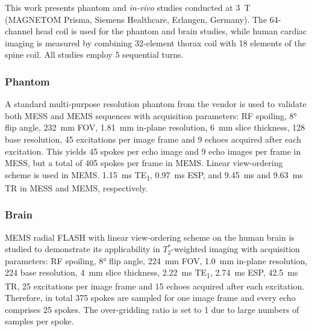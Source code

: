 This work presents phantom and \textit{in-vivo} studies conducted at \SI{3}{\tesla} (MAGNETOM Prisma, Siemens Healthcare, Erlangen, Germany). The \num{64}-channel head coil is used for the phantom and brain studies, while human cardiac imaging is measured by combining \num{32}-element thorax coil with \num{18} elements of the spine coil. All studies employ \num{5} sequential turns.

\subsubsection*{Phantom}
A standard multi-purpose resolution phantom from the vendor is used to validate both MESS and MEMS sequences with acquisition parameters: RF spoiling, \ang{8} flip angle, \SI{232}{\mm} \acs{FOV}, \SI{1.81}{\mm} in-plane resolution, \SI{6}{\mm} slice thickness, \num{128} base resolution, \num{45} excitations per image frame and \num{9} echoes acquired after each excitation. This yields \num{45} spokes per echo image and \num{9} echo images per frame in MESS, but a total of \num{405} spokes per frame in MEMS. Linear view-ordering scheme is used in MEMS. \SI{1.15}{\ms} \acs{TE}\textsubscript{1}, \SI{0.97}{\ms} ESP, and \SI{9.45}{\ms} and \SI{9.63}{\ms} TR in MESS and MEMS, respectively.

\subsubsection*{Brain}
MEMS radial FLASH with linear view-ordering scheme on the human brain is studied to demonstrate its applicability in $T_2^*$-weighted imaging with acquisition parameters: RF spoiling, \ang{8} flip angle, \SI{224}{\mm} FOV, \SI{1.0}{\mm} in-plane resolution, \num{224} base resolution, \SI{4}{\mm} slice thickness, \SI{2.22}{\ms} TE\textsubscript{\num{1}}, \SI{2.74}{\ms} ESP, \SI{42.5}{\ms} TR, \num{25} excitations per image frame and \num{15} echoes acquired after each excitation. Therefore, in total \num{375} spokes are sampled for one image frame and every echo comprises \num{25} spokes. The over-gridding ratio is set to \num{1} due to large numbers of samples per spoke.

